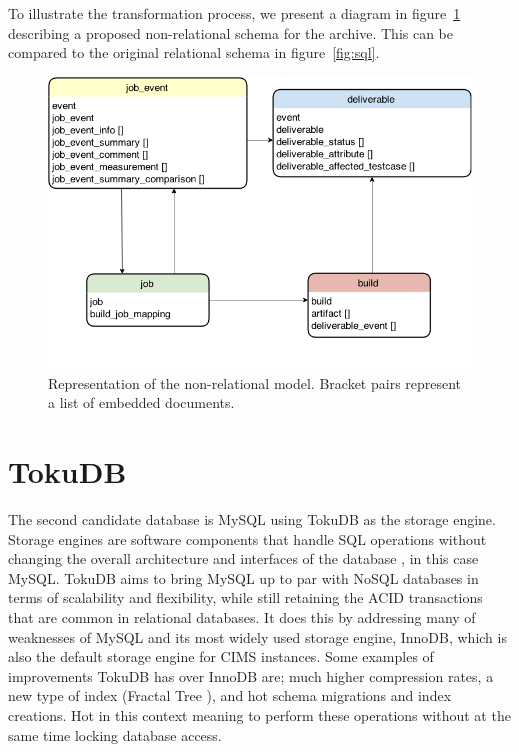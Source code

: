 To illustrate the transformation process, we present a diagram in figure~\ref{fig:nosql} describing a proposed non-relational schema for the archive. This can be compared to the original relational schema in figure~\ref{fig:sql}.

\begin{figure}[h!]
\centering
\includegraphics[scale=0.5]{figure/nosql.png}
\caption{Representation of the non-relational model. Bracket pairs represent a list of embedded documents.}
\label{fig:nosql}
\end{figure}

\section{TokuDB}
The second candidate database is MySQL using TokuDB \cite{tokudb} as the storage engine. Storage engines are software components that handle SQL operations without changing the overall architecture and interfaces of the database \cite{storageengine}, in this case MySQL. TokuDB aims to bring MySQL up to par with NoSQL databases in terms of scalability and flexibility, while still retaining the ACID transactions that are common in relational databases. It does this by addressing many of weaknesses of MySQL and its most widely used storage engine, InnoDB, which is also the default storage engine for CIMS instances. Some examples of improvements TokuDB has over InnoDB are; much higher compression rates, a new type of index (Fractal Tree \cite{fractaltree}), and hot schema migrations and index creations. Hot in this context meaning to perform these operations without at the same time locking database access.

